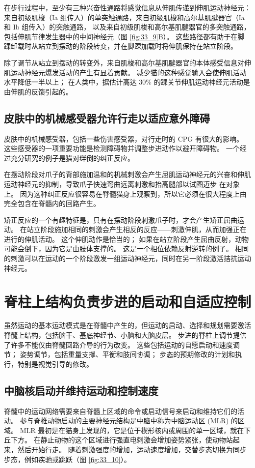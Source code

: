 在步行过程中，至少有三种兴奋性通路将感觉信息从伸肌传递到伸肌运动神经元：来自初级肌梭（Ia 组传入）的单突触通路，来自初级肌梭和高尔基肌腱器官（Ia 和 Ib 组传入）的突触通路， 以及来自初级肌梭和高尔基肌腱器官的多突触通路，包括伸肌节律发生器中的中间神经元（图 \ref{fig:33_9}B）。 这些路径都有助于在脚踝卸载时从站立到摆动的阶段转变，并在脚踝加载时将伸肌保持在站立阶段。

除了调节从站立到摆动的转变外，来自肌梭和高尔基肌腱器官的本体感受信息对伸肌运动神经元爆发活动的产生有显着贡献。 减少猫的这种感觉输入会使伸肌活动水平降低一半以上； 在人类中，据估计高达 30\% 的踝关节伸肌运动神经元活动是由伸肌的反馈引起的。

\subsection{皮肤中的机械感受器允许行走以适应意外障碍}
皮肤中的机械感受器，包括一些伤害感受器，对行走时的 CPG 有很大的影响。 这些感受器的一项重要功能是检测障碍物并调整步进动作以避开障碍物。 一个经过充分研究的例子是猫对绊倒的纠正反应。

在摆动阶段对爪子的背部施加温和的机械刺激会产生屈肌运动神经元的兴奋和伸肌运动神经元的抑制，导致爪子快速弯曲远离刺激和抬高腿部以试图迈步 在对象上。 因为这种纠正反应很容易在脊髓猫身上观察到，所以它必须在很大程度上由完全包含在脊髓内的回路产生。

矫正反应的一个有趣特征是，只有在摆动阶段刺激爪子时，才会产生矫正屈曲运动。 在站立阶段施加相同的刺激会产生相反的反应——刺激伸肌，从而加强正在进行的伸肌活动。 这个伸肌动作是恰当的； 如果在站立阶段产生屈曲反射，动物可能会倒下，因为它是由肢体支撑的。 这是一个相位依赖反射逆转的例子。 相同的刺激可以在运动的一个阶段激发一组运动神经元，同时在另一阶段激活拮抗运动神经元。


\section{脊柱上结构负责步进的启动和自适应控制}
虽然运动的基本运动模式是在脊髓中产生的，但运动的启动、选择和规划需要激活脊髓上结构，包括脑干、基底神经节、小脑和大脑皮层。 步进的脊柱上调节提供了许多不能仅由脊髓回路介导的行为改变。 这些包括运动的自愿启动和速度调节； 姿势调节，包括重量支撑、平衡和肢间协调； 步态的预期修改的计划和执行，特别是视觉引导的修改。

\subsection{中脑核启动并维持运动和控制速度}
脊髓中的运动网络需要来自脊髓上区域的命令或启动信号来启动和维持它们的活动。 参与脊椎动物启动的主要神经元结构是中脑中称为中脑运动区 (MLR) 的区域。 MLR 最初是在猫身上发现的，它是位于楔形核内或周围的单一区域，就在下丘下方。 
在静止动物的这个区域进行强直电刺激会增加姿势紧张，使动物站起来，然后开始行走。 
随着刺激强度的增加，运动速度增加，交替步态切换为同步步态，例如疾驰或跳跃（图 \ref{fig:33_10}）。

